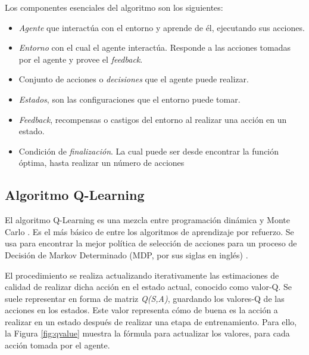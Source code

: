 	\begin{flushleft}
		Los componentes esenciales del algoritmo son los siguientes:
	\end{flushleft}
	\begin{itemize}
		\item \textit{Agente} que interactúa con el entorno y aprende de él, ejecutando sus acciones. 
		\item \textit{Entorno} con el cual el agente interactúa. Responde a las acciones tomadas por el agente y provee el \textit{feedback}.
		\item Conjunto de acciones o \textit{decisiones} que el agente puede realizar.
		\item \textit{Estados}, son las configuraciones que el entorno puede tomar.
		\item \textit{Feedback}, recompensas o castigos del entorno al realizar una acción en un estado.		
		\item Condición de \textit{finalización}. La cual puede ser desde encontrar la función óptima, hasta realizar un número de acciones 
	\end{itemize}


	\subsection{Algoritmo Q-Learning} 
		El algoritmo Q-Learning es una mezcla entre programación dinámica y Monte Carlo \cite{wang2012monte}. Es el más básico de entre los algoritmos de aprendizaje por refuerzo. Se usa para encontrar la mejor política de selección de acciones para un proceso de Decisión de Markov Determinado (MDP, por sus siglas en inglés) \cite{garcia2013markov}. 
		
		El procedimiento se realiza actualizando iterativamente las estimaciones de calidad de realizar dicha acción en el estado actual, conocido como valor-Q. Se suele representar en forma de matriz \textit{Q(S,A)}, guardando los valores-Q de las acciones en los estados. Este valor representa cómo de buena es la acción a realizar en un estado después de realizar una etapa de entrenamiento. Para ello, la Figura \ref{fig:qvalue} muestra la fórmula para actualizar los valores, para cada acción tomada por el agente.
				
